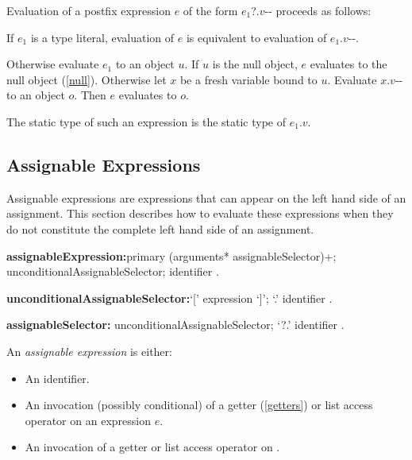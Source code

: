 \documentclass{article}
\newcommand{\code}[1]{{\sf #1}}
\begin{document}
\LMHash{}
Evaluation of a postfix expression $e$ of the form \code{$e_1$?.$v$-{}-}
proceeds as follows:

If $e_1$ is a type literal, evaluation of $e$ is equivalent to
evaluation of \code{$e_1$.$v$-{}-}.

Otherwise evaluate $e_1$ to an object $u$.
If $u$ is the null object, $e$ evaluates to the null object (\ref{null}).
Otherwise let $x$ be a fresh variable bound to $u$.
Evaluate \code{$x$.$v$-{}-} to an object $o$.
Then $e$ evaluates to $o$.


\LMHash{}
The static type of such an expression is the static type of \code{$e_1$.$v$}.


\subsection{ Assignable Expressions}

\LMHash{}
Assignable expressions are expressions that can appear on the left hand side of an assignment.
This section describes how to evaluate these expressions when they do not constitute the complete left hand side of an assignment.




\begin{grammar}

{\bf assignableExpression:}primary (arguments* assignableSelector)+;
      \SUPER{} unconditionalAssignableSelector;
      identifier
    .

{\bf unconditionalAssignableSelector:}`[' expression `]'; %
         `{\escapegrammar .}' identifier
    .

{\bf assignableSelector:}
         unconditionalAssignableSelector;
         `{\escapegrammar ?.}' identifier
    .

\end{grammar}


\LMHash{}
An {\em assignable expression} is either:
\begin{itemize}
 \item An identifier.
\item An invocation (possibly conditional) of a getter (\ref{getters}) or list access operator on an expression $e$.
\item An invocation of a getter or list access operator on  \SUPER{}.
\end{itemize}
\end{document}
